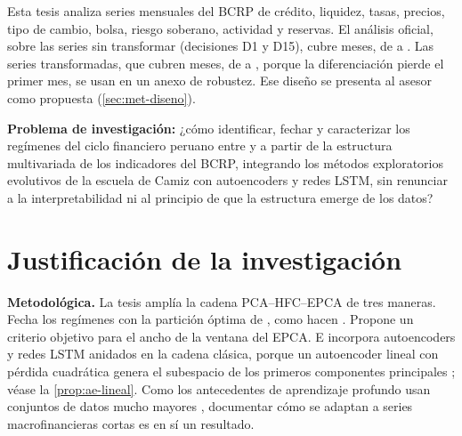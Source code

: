Esta tesis analiza \nSeries{} series mensuales del BCRP de crédito, liquidez, tasas, precios,
tipo de cambio, bolsa, riesgo soberano, actividad y reservas. El análisis oficial, sobre las
series sin transformar (decisiones D1 y D15), cubre \nMesesNiveles{} meses, de
\fechaInicioNiveles{} a \fechaFinDatos{}. Las series transformadas, que cubren
\nMesesTransformadas{} meses, de \fechaInicioTransformadas{} a \fechaFinDatos{}, porque la
diferenciación pierde el primer mes, se usan en un anexo de robustez. Ese diseño se presenta al
asesor como propuesta (\cref{sec:met-diseno}).

\textbf{Problema de investigación:} ¿cómo identificar, fechar y caracterizar los regímenes del
ciclo financiero peruano entre \anioInicioDatos{} y \anioFinDatos{} a partir de la estructura
multivariada de los indicadores del BCRP, integrando los métodos exploratorios evolutivos de la
escuela de Camiz con autoencoders y redes LSTM, sin renunciar a la interpretabilidad ni al
principio de que la estructura emerge de los datos?

\section{Justificación de la investigación}
\label{sec:justificacion}

\textbf{Metodológica.} La tesis amplía la cadena PCA--HFC--EPCA de tres maneras. Fecha los
regímenes con la partición óptima de
\textcite{fisher_1958}, como hacen
\textcite{camiz_roig_2011}. Propone un criterio objetivo para el ancho
de la ventana del EPCA. E incorpora autoencoders y redes LSTM anidados en la cadena clásica,
porque un autoencoder lineal con pérdida cuadrática genera el subespacio de los primeros
componentes principales
\parencite{bourlard_kamp_1988,baldi_hornik_1989}; véase la \cref{prop:ae-lineal}. Como los antecedentes de aprendizaje profundo
usan conjuntos de datos mucho mayores
\parencite{hinton_salakhutdinov_2006,tuhin_et_al_2025},
documentar cómo se adaptan a series macrofinancieras cortas es en sí un resultado.

